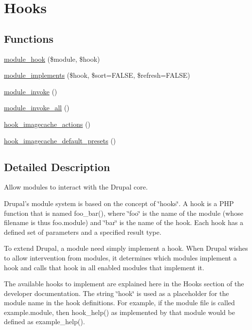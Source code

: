 \hypertarget{group__hooks}{
\section{Hooks}
\label{group__hooks}
}
\subsection*{Functions}
\begin{CompactItemize}
\item 
\hyperlink{group__hooks_g0d7a0b03039c561b63424b2a6cf6103f}{module\_\-hook} (\$module, \$hook)
\item 
\hyperlink{group__hooks_g55275aa404ced19ade543dec984cb93f}{module\_\-implements} (\$hook, \$sort=FALSE, \$refresh=FALSE)
\item 
\hyperlink{group__hooks_gbd6f189b7bcc74d05755d41ec1dfdfc3}{module\_\-invoke} ()
\item 
\hyperlink{group__hooks_g85e2028954b5e23c5ba2c5f1bd4e3e14}{module\_\-invoke\_\-all} ()
\item 
\hyperlink{group__hooks_gfea2ca26f6178230dca0a71ae21bef8b}{hook\_\-imagecache\_\-actions} ()
\item 
\hyperlink{group__hooks_gd1b2ea040501521cfab6683c33517998}{hook\_\-imagecache\_\-default\_\-presets} ()
\end{CompactItemize}


\subsection{Detailed Description}
Allow modules to interact with the Drupal core.

Drupal's module system is based on the concept of \char`\"{}hooks\char`\"{}. A hook is a PHP function that is named foo\_\-bar(), where \char`\"{}foo\char`\"{} is the name of the module (whose filename is thus foo.module) and \char`\"{}bar\char`\"{} is the name of the hook. Each hook has a defined set of parameters and a specified result type.

To extend Drupal, a module need simply implement a hook. When Drupal wishes to allow intervention from modules, it determines which modules implement a hook and calls that hook in all enabled modules that implement it.

The available hooks to implement are explained here in the Hooks section of the developer documentation. The string \char`\"{}hook\char`\"{} is used as a placeholder for the module name in the hook definitions. For example, if the module file is called example.module, then hook\_\-help() as implemented by that module would be defined as example\_\-help(). 

